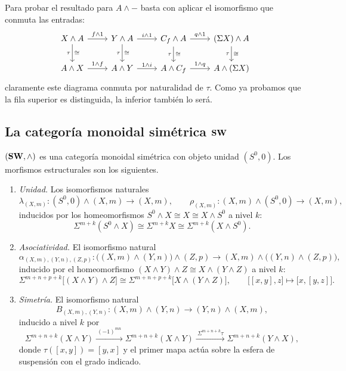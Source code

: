 \begin{sol}
Para probar el resultado para $A \wedge -$ basta con aplicar el isomorfismo que conmuta las entradas:
\[
\begin{tikzcd}
X\wedge A \arrow[r,"f\wedge1"] \arrow[d,"\tau"',"\cong"] &
Y\wedge A \arrow[r,"i\wedge1"] \arrow[d,"\tau"',"\cong"] &
C_f\wedge A \arrow[r,"q\wedge1"] \arrow[d,"\tau"',"\cong"] &
(\Sigma X)\wedge A \arrow[d,"\tau"',"\cong"] \\
A\wedge X \arrow[r,"1\wedge f"] &
A\wedge Y \arrow[r,"1\wedge i"] &
A\wedge C_f \arrow[r,"1\wedge q"] &
A\wedge(\Sigma X)
\end{tikzcd}
\]
claramente este diagrama conmuta por naturalidad de $\tau$. Como ya probamos que la fila superior es distinguida, la inferior también lo será.
\end{sol}

\subsection{La categoría monoidal simétrica \texorpdfstring{$\mathbf{SW}$}{SW}}

\begin{prop}\label{prop:monoidal}
$(\mathbf{SW},\wedge)$ es una categoría monoidal simétrica con objeto unidad $(S^0,0)$. Los morfismos estructurales son los siguientes.
\begin{enumerate}[label = \textup{(\roman*)}]
\item \emph{Unidad.} Los isomorfismos naturales
\[
\lambda_{(X,m)}\colon(S^0,0)\wedge(X,m)\longrightarrow(X,m),
\qquad
\rho_{(X,m)}\colon(X,m)\wedge(S^0,0)\longrightarrow(X,m),
\]
inducidos por los homeomorfismos $S^0\wedge X\cong X\cong X\wedge S^0$ a nivel $k$:
\[
\Sigma^{m+k}(S^0\wedge X)\cong\Sigma^{m+k}X\cong\Sigma^{m+k}(X\wedge S^0).
\]
\item \emph{Asociatividad.} El isomorfismo natural
\[
\alpha_{(X,m),(Y,n),(Z,p)}\colon\bigl((X,m)\wedge(Y,n)\bigr)\wedge(Z,p)\longrightarrow(X,m)\wedge\bigl((Y,n)\wedge(Z,p)\bigr),
\]
inducido por el homeomorfismo $(X\wedge Y)\wedge Z\cong X\wedge(Y\wedge Z)$ a nivel $k$:
\[
\Sigma^{m+n+p+k}\bigl[(X\wedge Y)\wedge Z\bigr]\cong\Sigma^{m+n+p+k}\bigl[X\wedge(Y\wedge Z)\bigr],
\qquad
\bigl[[x,y],z\bigr]\longmapsto\bigl[x,[y,z]\bigr].
\]
\item \emph{Simetría.} El isomorfismo natural
\[
B_{(X,m),(Y,n)}\colon(X,m)\wedge(Y,n)\longrightarrow(Y,n)\wedge(X,m),
\]
inducido a nivel $k$ por
\[
\Sigma^{m+n+k}(X\wedge Y)
\xrightarrow{\ (-1)^{mn}\ }\Sigma^{m+n+k}(X\wedge Y)
\xrightarrow{\ \Sigma^{m+n+k}\tau\ }\Sigma^{m+n+k}(Y\wedge X),
\]
donde $\tau([x,y])=[y,x]$ y el primer mapa actúa sobre la esfera de suspensión con el grado indicado.
\end{enumerate}
\end{prop}

